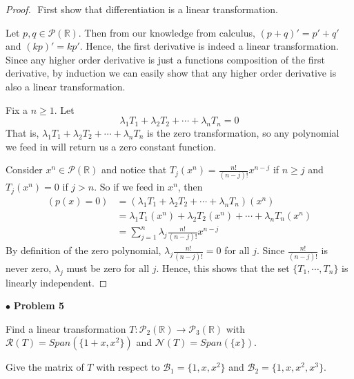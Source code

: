 \documentclass{article}
\begin{document}
\begin{proof}
$ $\newline
First show that differentiation is a linear transformation.

Let $p, q \in \mathcal{P}(\mathbb{R})$. Then from our knowledge from calculus, $(p+q)' = p' +q'$ and $(kp)' = kp'$. Hence, the first derivative is indeed a linear transformation. Since any higher order derivative is just a functions composition of the first derivative, by induction we can easily show that any higher order derivative is also a linear transformation.
\bigskip

Fix a $n \ge 1$. Let $$ \lambda_1T_1+\lambda_2T_2 + \cdots+ \lambda_nT_n = 0$$ 
That is, $ \lambda_1T_1+\lambda_2T_2 + \cdots+ \lambda_nT_n$ is the zero transformation, so any polynomial we feed in will return us a zero constant function.

Consider $x^n \in \mathcal{P}(\mathbb{R})$ and notice that $T_j(x^n) = \frac{n!}{(n-j)!}x^{n-j}$ if $ n \ge j$ and $T_j(x^n) = 0$ if $ j > n $. So if we feed in $x^n$, then 
\begin{align*}
(p(x)=0) &=  (\lambda_1T_1+\lambda_2T_2 + \cdots+ \lambda_nT_n)(x^n) \\
&= \lambda_1T_1(x^n) +\lambda_2T_2(x^n)+ \cdots + \lambda_nT_n(x^n) \\
&= \sum_{j=1}^{n} \lambda_j \frac{n!}{(n-j)!}x^{n-j}
\end{align*}
By definition of the zero polynomial, $ \lambda_j \frac{n!}{(n-j)!} = 0$ for all $j$. Since $\frac{n!}{(n-j)!}$ is never zero, $\lambda_j$ must be zero for all $j$. Hence, this shows that the set $\{T_1, \cdots, T_n \}$ is linearly independent.
\end{proof}

\newpage
$ \bullet$ \textbf{Problem 5}
\medskip

\begin{itshape}
Find a linear transformation $T: \mathcal{P}_2(\mathbb{R}) \to \mathcal{P}_3(\mathbb{R})$ with $\mathcal{R}(T) = Span(\{1+x, x^2 \})$ and $\mathcal{N}(T) = Span(\{x\})$.

Give the matrix of $T$ with respect to $\mathcal{B}_1 = \{ 1,x,x^2 \}$ and $\mathcal{B}_2=\{1,x,x^2,x^3 \}$.
\end{itshape}
\medskip
\end{document}
